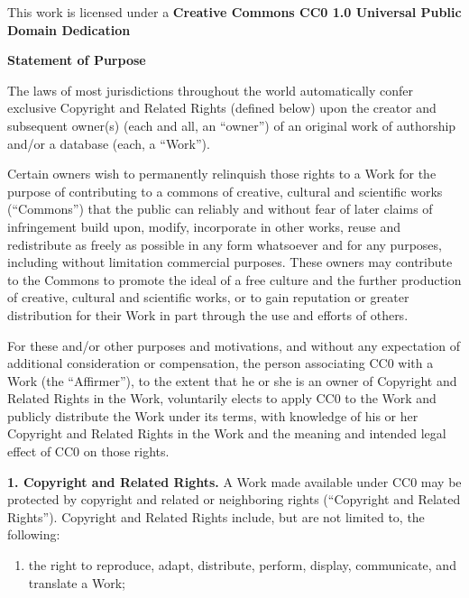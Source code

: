 {
  
  \noindent This work is licensed under a \newline
  \textbf{Creative Commons CC0 1.0 Universal Public Domain Dedication}

  \noindent \textbf{Statement of Purpose}

  \noindent The laws of most jurisdictions throughout the world
  automatically confer exclusive Copyright and Related Rights
  (defined below) upon the creator and subsequent owner(s) (each
  and all, an ``owner'') of an original work of authorship and/or
  a database (each, a ``Work'').

  \noindent Certain owners wish to permanently relinquish those rights
  to a Work for the purpose of contributing to a commons of
  creative, cultural and scientific works (``Commons'') that the
  public can reliably and without fear of later claims of
  infringement build upon, modify, incorporate in other works,
  reuse and redistribute as freely as possible in any form
  whatsoever and for any purposes, including without limitation
  commercial purposes. These owners may contribute to the
  Commons to promote the ideal of a free culture and the further
  production of creative, cultural and scientific works, or to
  gain reputation or greater distribution for their Work in part
  through the use and efforts of others.

  \noindent For these and/or other purposes and motivations, and
  without any expectation of additional consideration or
  compensation, the person associating CC0 with a Work (the
  ``Affirmer''), to the extent that he or she is an owner of
  Copyright and Related Rights in the Work, voluntarily elects
  to apply CC0 to the Work and publicly distribute the Work
  under its terms, with knowledge of his or her Copyright and
  Related Rights in the Work and the meaning and intended legal
  effect of CC0 on those rights.

  \noindent \textbf{1. Copyright and Related Rights.}
  A Work made available under CC0 may be protected by
  copyright and related or neighboring rights (``Copyright and
  Related Rights''). Copyright and Related Rights include, but
  are not limited to, the following:

  \begin{enumerate}[noitemsep,label=\roman*.]
    
    \item the right to reproduce, adapt, distribute, perform,
    display, communicate, and translate a Work;
    

\end{enumerate}}
